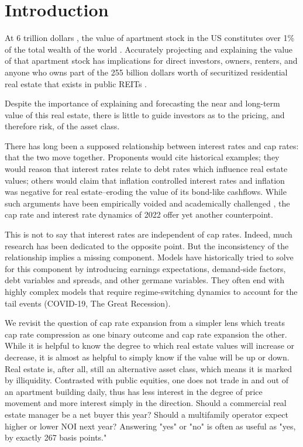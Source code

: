 \pagebreak
\setlength{\parindent}{4em}
\setlength{\parskip}{1em}

\section{Introduction}
At 6 trillion dollars \citep*{nmhc}, the value of apartment stock in the US constitutes over 1\% of the total wealth of the world \citep*{williams_2021}. Accurately projecting and explaining the value of that apartment stock has implications for direct investors, owners, renters, and anyone who owns part of the 255 billion dollars worth of securitized residential real estate that exists in public REITs \citep*{nareit_2022}. 

Despite the importance of explaining and forecasting the near and long-term value of this real estate, there is little to guide investors as to the pricing, and therefore risk, of the asset class.

There has long been a supposed relationship between interest rates and cap rates: that the two move together. Proponents would cite historical examples; they would reason that interest rates relate to debt rates which influence real estate values; others would claim that inflation controlled interest rates and inflation was negative for real estate--eroding the value of its bond-like cashflows. While  such arguments have been empirically voided and academically challenged \citep*{larriva2021determinants}, the cap rate and interest rate dynamics of 2022 offer yet another counterpoint. 

This is not to say that interest rates are independent of cap rates. Indeed, much research has been dedicated to the opposite point. But the inconsistency of the relationship implies a missing component. Models have historically tried to solve for this component by introducing earnings expectations, demand-side factors, debt variables and spreads, and other germane variables. They often end with highly complex models that require regime-switching dynamics to account for the tail events (COVID-19, The Great Recession).

We revisit the question of cap rate expansion from a simpler lens which treats cap rate compression as one binary outcome and cap rate expansion the other. While it is helpful to know the degree to which real estate values will increase or decrease, it is almost as helpful to simply know if the value will be up or down. Real estate is, after all, still an alternative asset class, which means it is marked by illiquidity. Contrasted with public equities, one does not trade in and out of an apartment building daily, thus has less interest in the degree of price movement and more interest simply in the direction. Should a commercial real estate manager be a net buyer this year? Should a multifamily operator expect higher or lower NOI next year? Answering "yes" or "no" is often as useful as "yes, by exactly 267 basis points."

